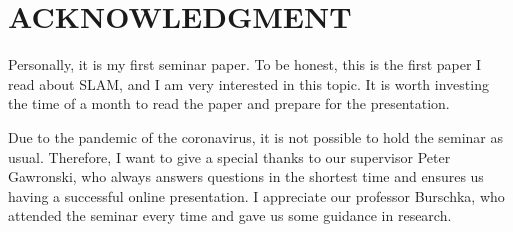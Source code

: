 \documentclass[letterpaper, 10 pt, conference]{ieeeconf}  %
\begin{document}







\section*{ACKNOWLEDGMENT}
Personally, it is my first seminar paper. To be honest, this is the first paper I read about SLAM, and I am very interested in this topic. It is worth investing the time of a month to read the paper and prepare for the presentation. 

Due to the pandemic of the coronavirus, it is not possible to hold the seminar as usual. Therefore, I want to give a special thanks to our supervisor Peter Gawronski, who always answers questions in the shortest time and ensures us having a successful online presentation. I appreciate our professor Burschka, who attended the seminar every time and gave us some guidance in research.
\cite{Murray.1993}

\printbibliography
\end{document}
